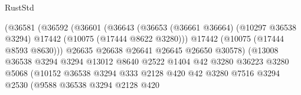\begin{lexlean}{RustStd}
\begin{coremodule}
                                          (@36581
                                            (@36592
                                              (@36601
                                                (@36643
                                                  (@36653
                                                    (@36661 @36664)
                                                    (@10297 @36538 @3294)
                                                    @17442
                                                    (@10075 (@17444 @8622 @3280)))
                                                  @17442
                                                  (@10075 (@17444 @8593 @8630)))
                                                @26635
                                                @26638
                                                @26641
                                                @26645
                                                @26650
                                                @30578)
                                              (@13008
                                                @36538
                                                @3294
                                                @3294
                                                @13012
                                                @8640
                                                @2522
                                                @1404
                                                @42
                                                @3280
                                                @36223
                                                @3280
                                                @5068
                                                (@10152
                                                  @36538
                                                  @3294
                                                  @333
                                                  @2128
                                                  @420
                                                  @42
                                                  @3280
                                                  @7516
                                                  @3294
                                                  @2530
                                                  (@9588
                                                    @36538
                                                    @3294
                                                    @2128
                                                    @420

\end{coremodule}
\end{lexlean}
